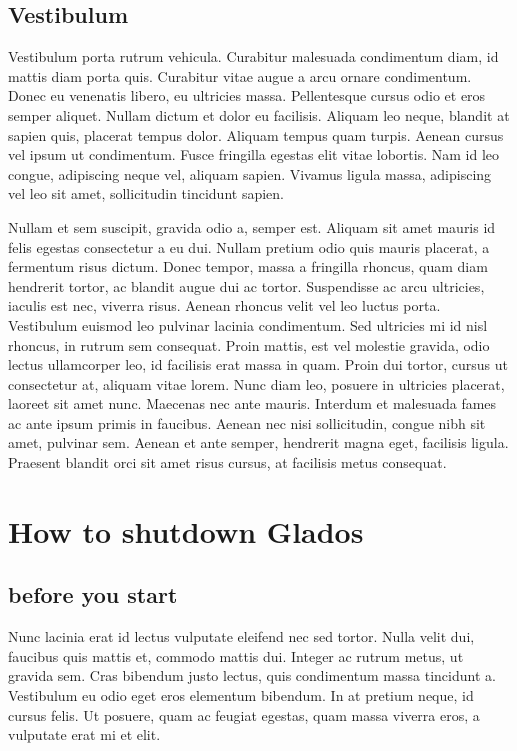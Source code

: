 \documentclass[11pt,a4paper,english]{report}
\begin{document}
\section{Vestibulum}
\par Vestibulum porta rutrum vehicula. Curabitur malesuada condimentum diam, id mattis diam porta quis. Curabitur vitae augue a arcu ornare condimentum. Donec eu venenatis libero, eu ultricies massa. Pellentesque cursus odio et eros semper aliquet. Nullam dictum et dolor eu facilisis. Aliquam leo neque, blandit at sapien quis, placerat tempus dolor. Aliquam tempus quam turpis. Aenean cursus vel ipsum ut condimentum. Fusce fringilla egestas elit vitae lobortis. Nam id leo congue, adipiscing neque vel, aliquam sapien. Vivamus ligula massa, adipiscing vel leo sit amet, sollicitudin tincidunt sapien.

\par Nullam et sem suscipit, gravida odio a, semper est. Aliquam sit amet mauris id felis egestas consectetur a eu dui. Nullam pretium odio quis mauris placerat, a fermentum risus dictum. Donec tempor, massa a fringilla rhoncus, quam diam hendrerit tortor, ac blandit augue dui ac tortor. Suspendisse ac arcu ultricies, iaculis est nec, viverra risus. Aenean rhoncus velit vel leo luctus porta. Vestibulum euismod leo pulvinar lacinia condimentum. Sed ultricies mi id nisl rhoncus, in rutrum sem consequat. Proin mattis, est vel molestie gravida, odio lectus ullamcorper leo, id facilisis erat massa in quam. Proin dui tortor, cursus ut consectetur at, aliquam vitae lorem. Nunc diam leo, posuere in ultricies placerat, laoreet sit amet nunc. Maecenas nec ante mauris. Interdum et malesuada fames ac ante ipsum primis in faucibus. Aenean nec nisi sollicitudin, congue nibh sit amet, pulvinar sem. Aenean et ante semper, hendrerit magna eget, facilisis ligula. Praesent blandit orci sit amet risus cursus, at facilisis metus consequat.

\chapter{How to shutdown Glados}
\section{before you start}
\par Nunc lacinia erat id lectus vulputate eleifend nec sed tortor. Nulla velit dui, faucibus quis mattis et, commodo mattis dui. Integer ac rutrum metus, ut gravida sem. Cras bibendum justo lectus, quis condimentum massa tincidunt a. Vestibulum eu odio eget eros elementum bibendum. In at pretium neque, id cursus felis. Ut posuere, quam ac feugiat egestas, quam massa viverra eros, a vulputate erat mi et elit. 
\end{document}
